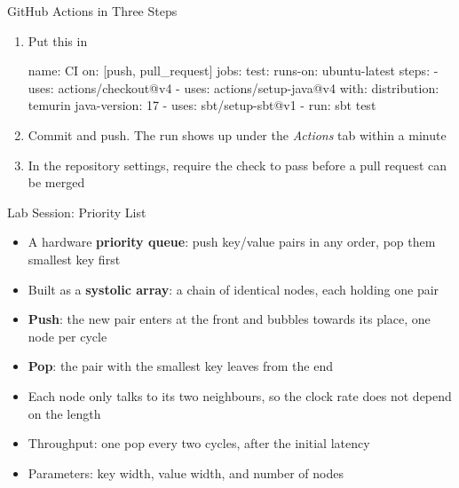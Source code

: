 \begin{frame}[fragile]{GitHub Actions in Three Steps}
	\begin{enumerate}
		\item Put this in 
		\begin{chisel}[basicstyle=\scriptsize\ttfamily]
name: CI
on: [push, pull_request]
jobs:
  test:
    runs-on: ubuntu-latest
    steps:
      - uses: actions/checkout@v4
      - uses: actions/setup-java@v4
        with:
          distribution: temurin
          java-version: 17
      - uses: sbt/setup-sbt@v1
      - run: sbt test
		\end{chisel}
		\item Commit and push. The run shows up under the \emph{Actions} tab within a minute
		\item In the repository settings, require the check to pass before a pull request can be merged
	\end{enumerate}
\end{frame}

\begin{frame}{Lab Session: Priority List}

	\begin{itemize}
		\item A hardware \textbf{priority queue}: push key/value pairs in any order, pop them smallest key first
		\item Built as a \textbf{systolic array}: a chain of identical nodes, each holding one pair
		\pause
		\item \textbf{Push}: the new pair enters at the front and bubbles towards its place, one node per cycle
		\item \textbf{Pop}: the pair with the smallest key leaves from the end
		\item Each node only talks to its two neighbours, so the clock rate does not depend on the length
		\pause
		\item Throughput: one pop every two cycles, after the initial latency
		\item Parameters: key width, value width, and number of nodes
	\end{itemize}

\end{frame}


